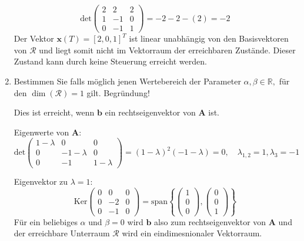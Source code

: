 \documentclass[crop=false]{standalone}
\begin{document}
\begin{task}
\begin{enumerate}[i]
\begin{solution}
\[\text{det}
\begin{pmatrix}
2 & 2 & 2\\
1 & -1 & 0\\
0 & -1 & 1
\end{pmatrix}
=
-2 -2 -(2) = -2
\]
Der Vektor $\mathbf{x}(T)=[2,0,1]^{T}$ ist linear unabhängig von den Basisvektoren von $\mathcal{R}$ und liegt somit nicht im Vektorraum der erreichbaren Zustände. Dieser Zustand kann durch keine Steuerung erreicht werden.
\end{solution}
  \item Bestimmen Sie falls möglich jenen Wertebereich der Parameter $\alpha, \beta \in \mathbb{R},$ für den $\operatorname{dim}(\mathcal{R})=1$ gilt. Begründung!
\begin{solution}
Dies ist erreicht, wenn $\mathbf{b}$ ein rechtseigenvektor von $\mathbf{A}$ ist.

Eigenwerte von $\mathbf{A}$: $
\text{det}
\begin{pmatrix}
1-\lambda & 0 & 0\\
0 & -1-\lambda & 0\\
0 & -1 & 1-\lambda
\end{pmatrix}
=\left(1-\lambda\right)^2\left(-1-\lambda\right)=0, \quad \lambda_{1,2} = 1, \lambda_3 = -1$


Eigenvektor zu $\lambda = 1$:
\[ \text{Ker}\begin{pmatrix}
0 & 0 & 0 \\
0 & -2 & 0\\
0 & -1 & 0
\end{pmatrix} = \text{span}\left\{ \begin{pmatrix}
1 \\ 0 \\ 0
\end{pmatrix}, \begin{pmatrix}
0 \\ 0 \\ 1
\end{pmatrix}\right\} \]
Für ein beliebiges $\alpha$ und $\beta=0$ wird $\mathbf{b}$ also zum rechtseigenvektor von $\mathbf{A}$ und der erreichbare Unterraum $\mathcal{R}$ wird ein eindimesnionaler Vektorraum.
\end{solution}
\end{enumerate}
\end{task}
\end{document}
